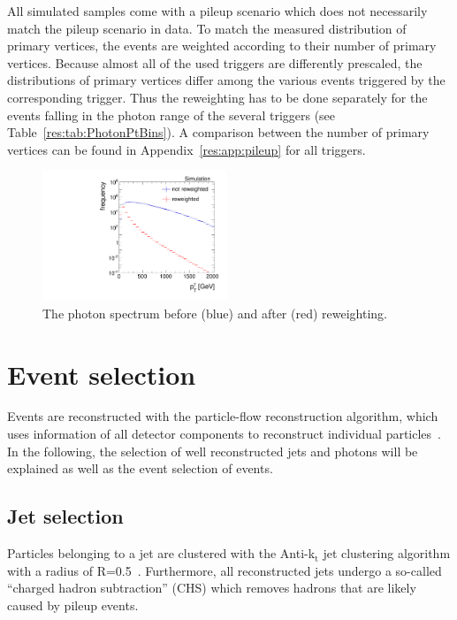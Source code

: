All simulated samples come with a pileup scenario which does not necessarily match the pileup scenario in data. 
To match the measured distribution of primary vertices, the events are weighted according to their number of primary vertices. 
Because almost all of the used triggers are differently prescaled, the distributions of primary vertices differ among the various events triggered by the corresponding trigger.
Thus the reweighting has to be done separately for the events falling in the photon \pt range of the several triggers (see Table~\ref{res:tab:PhotonPtBins}).
A comparison between the number of primary vertices can be found in Appendix~\ref{res:app:pileup} for all triggers.
\begin{figure}[ht]
  \centering
      \includegraphics[width=0.49\textwidth]{figures/resolution/eventSelection/PhotonPtComparison_reweighted.pdf} 
  \caption{The photon \pt spectrum before (blue) and after (red) reweighting.}  
  \label{res:fig:PhotonPtSpectrum}
\end{figure}


\section{Event selection}
\label{res:sec:EventSelection}
Events are reconstructed with the particle-flow reconstruction algorithm, which uses information of all detector components to reconstruct individual particles~\cite{CMS-PAS-PFT-09-001}.
In the following, the selection of well reconstructed jets and photons will be explained as well as the event selection of \GAMJET events.

\subsection{Jet selection}
Particles belonging to a jet are clustered with the Anti-k$_{\text{t}}$ jet clustering algorithm with a radius of R=0.5~\cite{Cacciari:2008gp}.
Furthermore, all reconstructed jets undergo a so-called ``charged hadron subtraction'' (CHS) which removes hadrons that are likely caused by pileup events.

